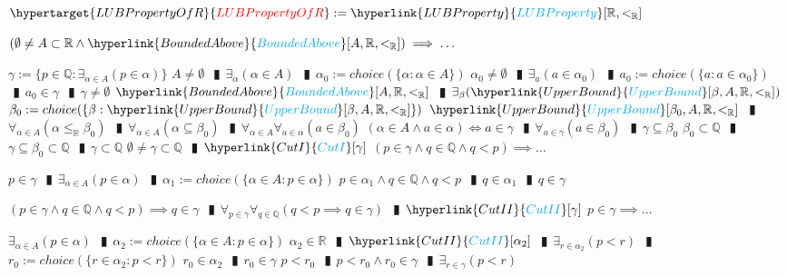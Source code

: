 \documentclass{book}
\newcommand{\df}[1]{\hypertarget{#1}{\textcolor{red}{#1}}}
\newcommand{\rf}[1]{\hyperlink{#1}{\textcolor{cyan}{#1}}}
\newcommand{\abr}{:=}
\newcommand{\pipe}{$\phantom{(}\vrectangleblack\phantom{)}$}
\begin{document}
$\df{LUBPropertyOfR} \abr \rf{LUBProperty}[\mathbb{R}, <_{\mathbb{R}}]$
\begin{enumerate}
  \lit $(\emptyset \neq A \subset \mathbb{R} \land \rf{BoundedAbove}[A, \mathbb{R}, <_{\mathbb{R}}]) \implies \ldots$
  \begin{enumerate}
    \lit $\gamma \abr \{p \in \mathbb{Q} : \exists_{\alpha \in A}(p \in \alpha)\}$
    \lit $A \neq \emptyset$ \pipe $\exists_{\alpha}(\alpha \in A)$ \pipe $\alpha_0 \abr choice(\{\alpha : \alpha \in A\})$
    \lit $\alpha_0 \neq \emptyset$ \pipe $\exists_{a}(a \in \alpha_0)$ \pipe $a_0 \abr choice(\{a : a \in \alpha_0\})$ \pipe $a_0 \in \gamma$ \pipe $\gamma \neq \emptyset$
    \lit $\rf{BoundedAbove}[A, \mathbb{R}, <_{\mathbb{R}}]$ \pipe $\exists_{\beta}(\rf{UpperBound}[\beta, A, \mathbb{R}, <_{\mathbb{R}}])$
    \lit $\beta_0 \abr choice(\{\beta : \rf{UpperBound}[\beta, A, \mathbb{R}, <_{\mathbb{R}}]\})$
    \lit $\rf{UpperBound}[\beta_0, A, \mathbb{R}, <_{\mathbb{R}}]$ \pipe $\forall_{\alpha \in A}(\alpha \leq_{\mathbb{R}} \beta_0)$ \pipe $\forall_{\alpha \in A}(\alpha \subseteq \beta_0)$ \pipe $\forall_{\alpha \in A} \forall_{a \in \alpha}(a \in \beta_0)$
    \lit $(\alpha \in A \land a \in \alpha) \iff a \in \gamma$ \pipe $\forall_{a \in \gamma}(a \in \beta_0)$ \pipe $\gamma \subseteq \beta_0$
    \lit $\beta_0 \subset \mathbb{Q}$ \pipe $\gamma \subseteq \beta_0 \subset \mathbb{Q}$ \pipe $\gamma \subset \mathbb{Q}$
    \lit $\emptyset \neq \gamma \subset \mathbb{Q}$ \pipe $\rf{CutI}[\gamma]$
    \lit $(p \in \gamma \land q \in \mathbb{Q} \land q < p) \implies \ldots$
    \begin{enumerate}
      \lit $p \in \gamma$ \pipe $\exists_{\alpha \in A}(p \in \alpha)$ \pipe $\alpha_1 \abr choice(\{\alpha \in A : p \in \alpha\})$
      \lit $p \in \alpha_1 \land q \in \mathbb{Q} \land q < p$ \pipe $q \in \alpha_1$ \pipe $q \in \gamma$
    \end{enumerate}
    \lit $(p \in \gamma \land q \in \mathbb{Q} \land q < p) \implies q \in \gamma$ \pipe $\forall_{p \in \gamma} \forall_{q \in \mathbb{Q}}(q < p \implies q \in \gamma)$ \pipe $\rf{CutII}[\gamma]$
    \lit $p \in \gamma \implies \ldots$
    \begin{enumerate}
      \lit $\exists_{\alpha \in A}(p \in \alpha)$ \pipe $\alpha_2 \abr choice(\{\alpha \in A : p \in \alpha\})$
      \lit $\alpha_2 \in \mathbb{R}$ \pipe $\rf{CutII}[\alpha_2]$ \pipe $\exists_{r \in \alpha_2}(p < r)$ \pipe $r_0 \abr choice(\{r \in \alpha_2 : p < r\})$
      \lit $r_0 \in \alpha_2$ \pipe $r_0 \in \gamma$
      \lit $p < r_0$ \pipe $p < r_0 \land r_0 \in \gamma$ \pipe $\exists_{r \in \gamma}(p < r)$

\end{enumerate}
\end{enumerate}
\end{enumerate}
\end{document}
